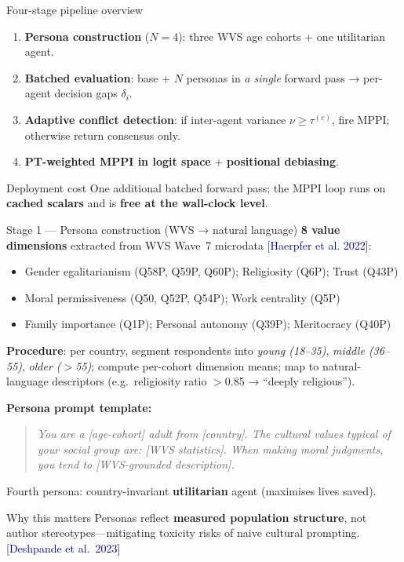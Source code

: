 \documentclass[10pt,aspectratio=169]{beamer}
\newcommand{\cit}[1]{{\scriptsize\textcolor{darkblue}{[#1]}}}
\begin{document}
\begin{frame}{Four-stage pipeline overview}
  \begin{enumerate}
    \item \textbf{Persona construction} ($N=4$): three WVS age cohorts + one utilitarian agent.
    \item \textbf{Batched evaluation}: base + $N$ personas in \emph{a single} forward pass → per-agent decision gaps $\delta_i$.
    \item \textbf{Adaptive conflict detection}: if inter-agent variance $\nu \ge \tau^{(c)}$, fire MPPI; otherwise return consensus only.
    \item \textbf{PT-weighted MPPI in logit space} + \textbf{positional debiasing}.
  \end{enumerate}
  \vspace{0.3em}
  \begin{block}{Deployment cost}
    One additional batched forward pass; the MPPI loop runs on \textbf{cached scalars} and is \textbf{free at the wall-clock level}.
  \end{block}
\end{frame}

\begin{frame}{Stage 1 — Persona construction (WVS → natural language)}
  \footnotesize
  \textbf{8 value dimensions} extracted from WVS Wave~7 microdata \cit{Haerpfer et al. 2022}:
  \begin{itemize}
    \item Gender egalitarianism (Q58P, Q59P, Q60P); Religiosity (Q6P); Trust (Q43P)
    \item Moral permissiveness (Q50, Q52P, Q54P); Work centrality (Q5P)
    \item Family importance (Q1P); Personal autonomy (Q39P); Meritocracy (Q40P)
  \end{itemize}
  \vspace{0.3em}
  \textbf{Procedure}: per country, segment respondents into \emph{young (18--35)}, \emph{middle (36--55)}, \emph{older ($>$55)}; compute per-cohort dimension means; map to natural-language descriptors (e.g.\ religiosity ratio $>$0.85 → ``deeply religious'').
  \vspace{0.3em}

  \textbf{Persona prompt template:}
  \begin{quote}\itshape\scriptsize
    You are a [age-cohort] adult from [country]. The cultural values typical of your social
    group are: [WVS statistics]. When making moral judgments, you tend to [WVS-grounded description].
  \end{quote}
  Fourth persona: country-invariant \textbf{utilitarian} agent (maximises lives saved).
  \begin{alertblock}{Why this matters}
    Personas reflect \textbf{measured population structure}, not author stereotypes---mitigating toxicity risks of naive cultural prompting. \cit{Deshpande et al.\ 2023}
  \end{alertblock}
\end{frame}
\end{document}
